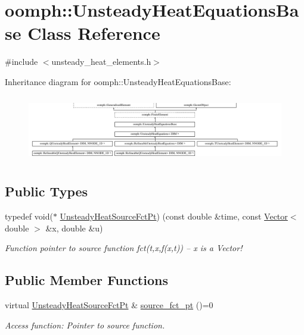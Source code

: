 \hypertarget{classoomph_1_1UnsteadyHeatEquationsBase}{}\section{oomph\+:\+:Unsteady\+Heat\+Equations\+Base Class Reference}
\label{classoomph_1_1UnsteadyHeatEquationsBase}


{\ttfamily \#include $<$unsteady\+\_\+heat\+\_\+elements.\+h$>$}

Inheritance diagram for oomph\+:\+:Unsteady\+Heat\+Equations\+Base\+:\begin{figure}[H]
\begin{center}
\leavevmode
\includegraphics[height=2.955145cm]{classoomph_1_1UnsteadyHeatEquationsBase}
\end{center}
\end{figure}
\subsection*{Public Types}
\begin{DoxyCompactItemize}
\item 
typedef void($\ast$ \hyperlink{classoomph_1_1UnsteadyHeatEquationsBase_accf23819639b695221238a0e7b1c8384}{Unsteady\+Heat\+Source\+Fct\+Pt}) (const double \&time, const \hyperlink{classoomph_1_1Vector}{Vector}$<$ double $>$ \&x, double \&u)
\begin{DoxyCompactList}\small\item\em Function pointer to source function fct(t,x,f(x,t)) -- x is a Vector! \end{DoxyCompactList}\end{DoxyCompactItemize}
\subsection*{Public Member Functions}
\begin{DoxyCompactItemize}
\item 
virtual \hyperlink{classoomph_1_1UnsteadyHeatEquationsBase_accf23819639b695221238a0e7b1c8384}{Unsteady\+Heat\+Source\+Fct\+Pt} \& \hyperlink{classoomph_1_1UnsteadyHeatEquationsBase_a723b841dae0679dcfda13e565dd40f6b}{source\+\_\+fct\+\_\+pt} ()=0
\begin{DoxyCompactList}\small\item\em Access function\+: Pointer to source function. \end{DoxyCompactList}\end{DoxyCompactItemize}
